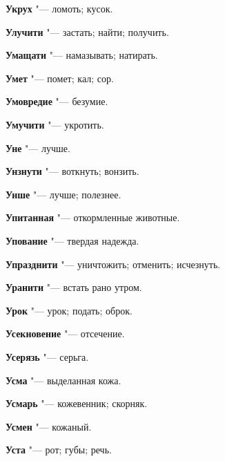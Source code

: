 \begin{mymulticols}{2}
\noindent\textbf{Укрух} "--- ломоть; кусок. 




\noindent\textbf{Улучити} "--- застать; найти; получить. 




\noindent\textbf{Умащати} "--- намазывать; натирать. 




\noindent\textbf{Умет} "--- помет; кал; сор. 




\noindent\textbf{Умовредие} "--- безумие. 




\noindent\textbf{Умучити} "--- укротить. 




\noindent\textbf{Уне} "--- лучше. 




\noindent\textbf{Унзнути} "--- воткнуть; вонзить. 




\noindent\textbf{Унше} "--- лучше; полезнее. 




\noindent\textbf{Упитанная} "--- откормленные животные. 




\noindent\textbf{Упование} "--- твердая надежда. 




\noindent\textbf{Упразднити} "--- уничтожить; отменить; исчезнуть. 




\noindent\textbf{Уранити} "--- встать рано утром. 




\noindent\textbf{Урок} "--- урок; подать; оброк. 




\noindent\textbf{Усекновение} "--- отсечение. 




\noindent\textbf{Усерязь} "--- серьга. 




\noindent\textbf{Усма} "--- выделанная кожа. 




\noindent\textbf{Усмарь} "--- кожевенник; скорняк. 




\noindent\textbf{Усмен} "--- кожаный. 




\noindent\textbf{Уста} "--- рот; губы; речь. 





\end{mymulticols}
